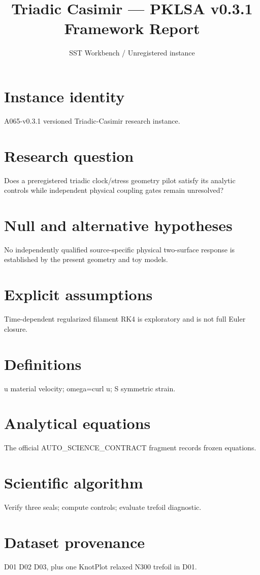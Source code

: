 \documentclass[10pt,a4paper]{article}
\title{Triadic Casimir --- PKLSA v0.3.1 Framework Report}
\author{SST Workbench / Unregistered instance}
\begin{document}
\maketitle
\section{Instance identity}
A065-v0.3.1 versioned Triadic-Casimir research instance.
\section{Research question}
Does a preregistered triadic clock/stress geometry pilot satisfy its analytic controls while independent physical coupling gates remain unresolved?
\section{Null and alternative hypotheses}
No independently qualified source-specific physical two-surface response is established by the present geometry and toy models.
\section{Explicit assumptions}
Time-dependent regularized filament RK4 is exploratory and is not full Euler closure.
\section{Definitions}
u material velocity; omega=curl u; S symmetric strain.
\section{Analytical equations}
The official AUTO\_SCIENCE\_CONTRACT fragment records frozen equations.

\section{Scientific algorithm}
Verify three seals; compute controls; evaluate trefoil diagnostic.
\section{Dataset provenance}
D01 D02 D03, plus one KnotPlot relaxed N300 trefoil in D01.
\end{document}
